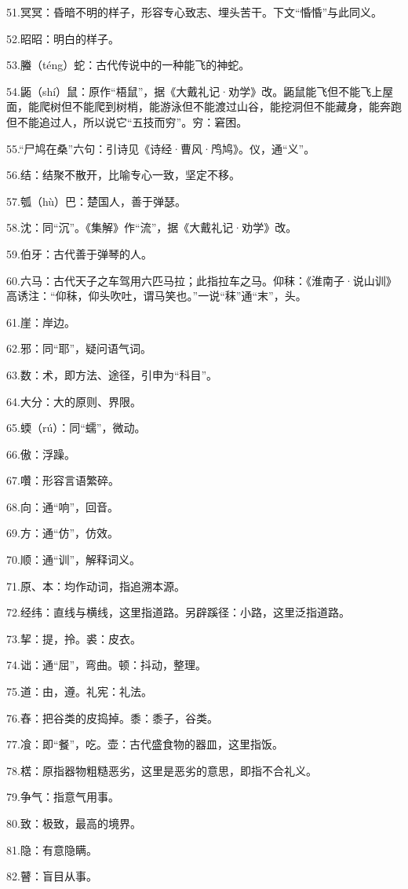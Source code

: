 \documentclass[letterpaper,12pt,english]{sphinxmanual}
\begin{document}
51.冥冥：昏暗不明的样子，形容专心致志、埋头苦干。下文“惛惛”与此同义。

52.昭昭：明白的样子。

53.螣（téng）蛇：古代传说中的一种能飞的神蛇。

54.鼫（shí）鼠：原作“梧鼠”，据《大戴礼记·劝学》改。鼫鼠能飞但不能飞上屋面，能爬树但不能爬到树梢，能游泳但不能渡过山谷，能挖洞但不能藏身，能奔跑但不能追过人，所以说它“五技而穷”。穷：窘困。

55.“尸鸠在桑”六句：引诗见《诗经·曹风·鸤鸠》。仪，通“义”。

56.结：结聚不散开，比喻专心一致，坚定不移。

57.瓠（hù）巴：楚国人，善于弹瑟。

58.沈：同“沉”。《集解》作“流”，据《大戴礼记·劝学》改。

59.伯牙：古代善于弹琴的人。

60.六马：古代天子之车驾用六匹马拉；此指拉车之马。仰秣：《淮南子·说山训》高诱注：“仰秣，仰头吹吐，谓马笑也。”一说“秣”通“末”，头。

61.崖：岸边。

62.邪：同“耶”，疑问语气词。

63.数：术，即方法、途径，引申为“科目”。

64.大分：大的原则、界限。

65.蝡（rú）：同“蠕”，微动。

66.傲：浮躁。

67.囋：形容言语繁碎。

68.向：通“响”，回音。

69.方：通“仿”，仿效。

70.顺：通“训”，解释词义。

71.原、本：均作动词，指追溯本源。

72.经纬：直线与横线，这里指道路。另辟蹊径：小路，这里泛指道路。

73.挈：提，拎。裘：皮衣。

74.诎：通“屈”，弯曲。顿：抖动，整理。

75.道：由，遵。礼宪：礼法。

76.舂：把谷类的皮捣掉。黍：黍子，谷类。

77.飡：即“餐”，吃。壶：古代盛食物的器皿，这里指饭。

78.楛：原指器物粗糙恶劣，这里是恶劣的意思，即指不合礼义。

79.争气：指意气用事。

80.致：极致，最高的境界。

81.隐：有意隐瞒。

82.瞽：盲目从事。
\end{document}
